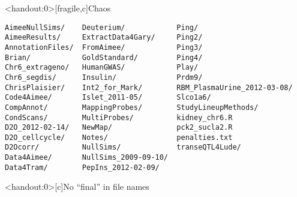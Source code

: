 \documentclass[aspectratio=169,12pt,t]{beamer}
\begin{document}
\begin{frame}<handout:0>[fragile,c]{Chaos}

\addtocounter{framenumber}{-1}

\begin{center}
\begin{minipage}[c]{11.33cm}
\begin{semiverbatim}
\lstset{basicstyle=\scriptsize}
\begin{lstlisting}[linewidth=11.33cm]
AimeeNullSims/    Deuterium/            Ping/
AimeeResults/     ExtractData4Gary/     Ping2/
AnnotationFiles/  FromAimee/            Ping3/
Brian/            GoldStandard/         Ping4/
Chr6_extrageno/   HumanGWAS/            Play/
Chr6_segdis/      Insulin/              Prdm9/
ChrisPlaisier/    Int2_for_Mark/        RBM_PlasmaUrine_2012-03-08/
Code4Aimee/       Islet_2011-05/        Slco1a6/
CompAnnot/        MappingProbes/        StudyLineupMethods/
CondScans/        MultiProbes/          kidney_chr6.R
D2O_2012-02-14/   NewMap/               pck2_sucla2.R
D2O_cellcycle/    Notes/                penalties.txt
D2Ocorr/          NullSims/             transeQTL4Lude/
Data4Aimee/       NullSims_2009-09-10/
Data4Tram/        PepIns_2012-02-09/
\end{lstlisting}
\end{semiverbatim}
\end{minipage}
\end{center}

\end{frame}




\begin{frame}<handout:0>[c]{No ``{\hilit final}'' in file names}

\vspace*{3mm}

\centering


\end{frame}
\end{document}
